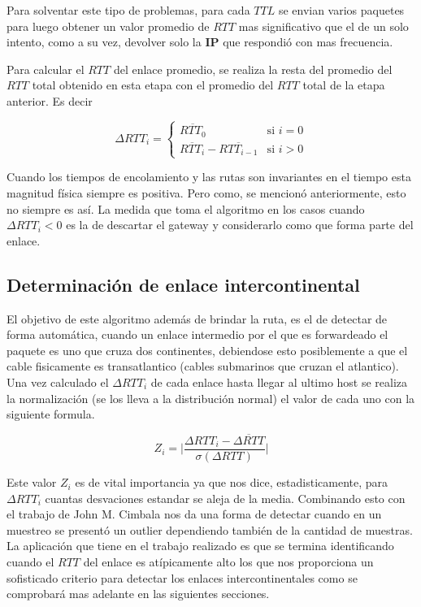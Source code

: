 Para solventar este tipo de problemas, para cada $TTL$ se envian varios paquetes
para luego obtener un valor promedio de $RTT$ mas significativo que el de un
solo intento, como a su vez, devolver solo la \textbf{IP} que respondió con mas
frecuencia.

Para calcular el $RTT$ del enlace promedio, se realiza la resta
del promedio del $RTT$ total obtenido en esta etapa con el promedio del $RTT$ total
de la etapa anterior.
Es decir

\begin{equation}
	\Delta RTT_{i} = \left\{
		\begin{array}{cl}
			\overline{RTT_{0}} & \mbox{si } i = 0\\
			\overline{RTT_{i}} - \overline{RTT_{i-1}} & \mbox{si } i > 0
		\end{array}
		\right.
\end{equation}

Cuando los tiempos de encolamiento y las rutas son invariantes en el tiempo
esta magnitud física siempre es positiva. Pero como, se mencionó anteriormente, esto
no siempre es así. La medida que toma el algoritmo en los casos cuando
$\Delta RTT_{i} < 0$ es la de descartar el
gateway y considerarlo como que forma parte del enlace.

\subsection{Determinación de enlace intercontinental}

El objetivo de este algoritmo además de brindar la ruta, es el de detectar de
forma automática, cuando un enlace intermedio por el que es forwardeado el
paquete es uno que cruza dos continentes, debiendose esto posiblemente a
que el cable fisicamente es transatlantico (cables submarinos que cruzan el
atlantico). Una vez calculado el $\Delta RTT_{i}$ de cada enlace hasta llegar
al ultimo host se realiza la normalización (se los lleva a la distribución normal)
el valor de cada uno con la siguiente formula.

\begin{equation}\label{eq:z}
	Z_{i} = \lvert\frac{\Delta RTT_{i} - \overline{\Delta RTT}}{\sigma \left(\Delta RTT \right)}\rvert
\end{equation}

Este valor $Z_{i}$ es de vital importancia ya que nos dice, estadisticamente,
para $\Delta RTT_{i}$ cuantas desvaciones estandar se aleja de la media.
Combinando esto con el trabajo de John M. Cimbala\cite{cimbala} nos da una forma de
detectar cuando en un muestreo se presentó un outlier dependiendo también de la
cantidad de muestras. La aplicación que tiene en el trabajo realizado es que se
termina identificando cuando el $RTT$ del enlace es atípicamente alto los que nos
proporciona un sofisticado criterio para detectar los enlaces
intercontinentales como se comprobará mas adelante en las siguientes secciones.
